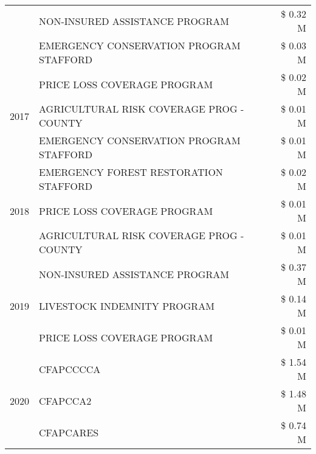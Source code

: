 \begin{tabular}{llr}
 & NON-INSURED ASSISTANCE PROGRAM                & \$ 0.32 M \\
 & EMERGENCY CONSERVATION PROGRAM STAFFORD       & \$ 0.03 M \\
\cline{1-3}
\multirow[t]{3}{*}{2017} & PRICE LOSS COVERAGE PROGRAM & \$ 0.02 M \\
 & AGRICULTURAL RISK COVERAGE PROG - COUNTY & \$ 0.01 M \\
 & EMERGENCY CONSERVATION PROGRAM STAFFORD & \$ 0.01 M \\
\cline{1-3}
\multirow[t]{3}{*}{2018} & EMERGENCY FOREST RESTORATION STAFFORD & \$ 0.02 M \\
 & PRICE LOSS COVERAGE PROGRAM & \$ 0.01 M \\
 & AGRICULTURAL RISK COVERAGE PROG - COUNTY & \$ 0.01 M \\
\cline{1-3}
\multirow[t]{3}{*}{2019} & NON-INSURED ASSISTANCE PROGRAM & \$ 0.37 M \\
 & LIVESTOCK INDEMNITY PROGRAM & \$ 0.14 M \\
 & PRICE LOSS COVERAGE PROGRAM & \$ 0.01 M \\
\cline{1-3}
\multirow[t]{3}{*}{2020} & CFAPCCCCA & \$ 1.54 M \\
 & CFAPCCA2 & \$ 1.48 M \\
 & CFAPCARES & \$ 0.74 M \\
\cline{1-3}
\bottomrule
\end{tabular}
